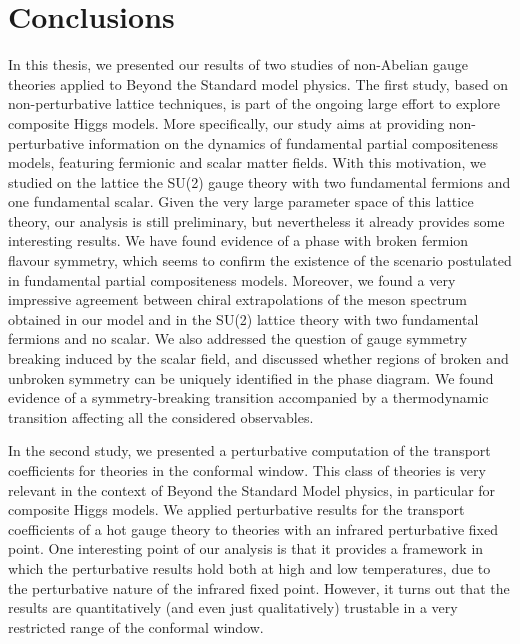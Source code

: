 \chapter{Conclusions}


In this thesis, we presented our results of two studies of non-Abelian gauge theories applied to Beyond the Standard model physics. 
The first study, based on non-perturbative lattice techniques, is part of the ongoing large effort to explore composite Higgs models. 
More specifically, our study aims at providing non-perturbative information on the dynamics of fundamental partial compositeness models, featuring fermionic and scalar matter fields.
With this motivation, we studied on the lattice the SU(2) gauge theory with two fundamental fermions and one fundamental scalar. Given the very large parameter space of this lattice theory, our analysis is still preliminary, but nevertheless it already provides some interesting results. 
We have found evidence of a phase with broken fermion flavour symmetry, which seems to confirm the existence of the scenario postulated in fundamental partial compositeness models. 
Moreover, we found a very impressive agreement between chiral extrapolations of the meson spectrum obtained in our model and in the SU(2) lattice theory with two fundamental fermions and no scalar. 
We also addressed the question of gauge symmetry breaking induced by the scalar field, and discussed whether regions of broken and unbroken symmetry can be uniquely identified in the phase diagram. We found evidence of a symmetry-breaking transition accompanied by a thermodynamic transition affecting all the considered observables.

In the second study, we presented a perturbative computation of the transport coefficients for theories in the conformal window. 
This class of theories is very relevant in the context of Beyond the Standard Model physics, in particular for composite Higgs models. We applied perturbative results for the transport coefficients of a hot gauge theory to theories with an infrared perturbative fixed point. One interesting point of our analysis is that it provides a framework in which the perturbative results hold both at high and low temperatures, due to the perturbative nature of the infrared fixed point. 
However, it turns out that the results are quantitatively (and even just qualitatively) trustable in a very restricted range of the conformal window. 